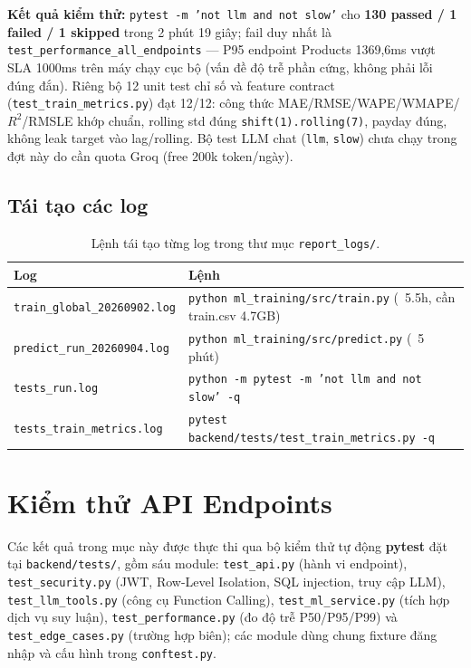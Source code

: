 \documentclass[12pt,a4paper]{report}
\begin{document}
\textbf{Kết quả kiểm thử:} \texttt{pytest -m 'not llm and not slow'} cho \textbf{130
passed / 1 failed / 1 skipped} trong 2 phút 19 giây; fail duy nhất là
\texttt{test\_performance\_all\_endpoints} --- P95 endpoint Products 1369,6ms vượt SLA
1000ms trên máy chạy cục bộ (vấn đề độ trễ phần cứng, không phải lỗi đúng đắn). Riêng
bộ 12 unit test chỉ số và feature contract (\texttt{test\_train\_metrics.py}) đạt
12/12: công thức MAE/RMSE/WAPE/WMAPE/$R^2$/RMSLE khớp chuẩn, rolling std đúng
\texttt{shift(1).rolling(7)}, payday đúng, không leak target vào lag/rolling. Bộ test
LLM chat (\texttt{llm}, \texttt{slow}) chưa chạy trong đợt này do cần quota Groq
(free 200k token/ngày).

\subsection{Tái tạo các log}

\begin{table}[H]
\centering
\small
\begin{tabular}{@{}ll@{}}
\toprule
\textbf{Log} & \textbf{Lệnh} \\
\midrule
\texttt{train\_global\_20260902.log} & \texttt{python ml\_training/src/train.py} (~5.5h, cần train.csv 4.7GB) \\
\texttt{predict\_run\_20260904.log} & \texttt{python ml\_training/src/predict.py} (~5 phút) \\
\texttt{tests\_run.log} & \texttt{python -m pytest -m 'not llm and not slow' -q} \\
\texttt{tests\_train\_metrics.log} & \texttt{pytest backend/tests/test\_train\_metrics.py -q} \\
\bottomrule
\end{tabular}
\caption{Lệnh tái tạo từng log trong thư mục \texttt{report\_logs/}.}
\label{tab:repro}
\end{table}

\section{Kiểm thử API Endpoints}

Các kết quả trong mục này được thực thi qua bộ kiểm thử tự động \textbf{pytest} đặt tại \texttt{backend/tests/}, gồm sáu module: \texttt{test\_api.py} (hành vi endpoint), \texttt{test\_security.py} (JWT, Row-Level Isolation, SQL injection, truy cập LLM), \texttt{test\_llm\_tools.py} (công cụ Function Calling), \texttt{test\_ml\_service.py} (tích hợp dịch vụ suy luận), \texttt{test\_performance.py} (đo độ trễ P50/P95/P99) và \texttt{test\_edge\_cases.py} (trường hợp biên); các module dùng chung fixture đăng nhập và cấu hình trong \texttt{conftest.py}.
\end{document}

